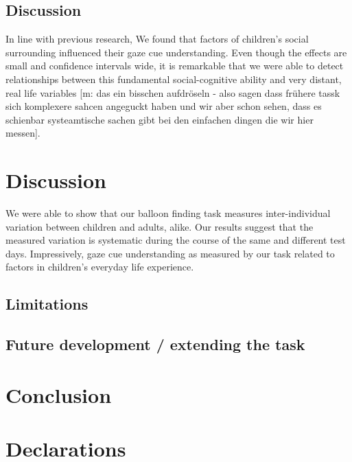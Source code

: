 \documentclass[
  man,floatsintext]{apa6}
\begin{document}
\hypertarget{discussion-2}{%
\subsection{Discussion}\label{discussion-2}}

In line with previous research, We found that factors of children's social surrounding influenced their gaze cue understanding. Even though the effects are small and confidence intervals wide, it is remarkable that we were able to detect relationships between this fundamental social-cognitive ability and very distant, real life variables {[}m: das ein bisschen aufdröseln - also sagen dass frühere tassk sich komplexere sahcen angeguckt haben und wir aber schon sehen, dass es schienbar systeamtische sachen gibt bei den einfachen dingen die wir hier messen{]}.

\hypertarget{discussion-3}{%
\section{Discussion}\label{discussion-3}}

We were able to show that our balloon finding task measures inter-individual variation between children and adults, alike. Our results suggest that the measured variation is systematic during the course of the same and different test days. Impressively, gaze cue understanding as measured by our task related to factors in children's everyday life experience.

\hypertarget{limitations}{%
\subsection{Limitations}\label{limitations}}

\hypertarget{future-development-extending-the-task}{%
\subsection{Future development / extending the task}\label{future-development-extending-the-task}}

\hypertarget{conclusion}{%
\section{Conclusion}\label{conclusion}}

\hypertarget{declarations}{%
\section{Declarations}\label{declarations}}
\end{document}

